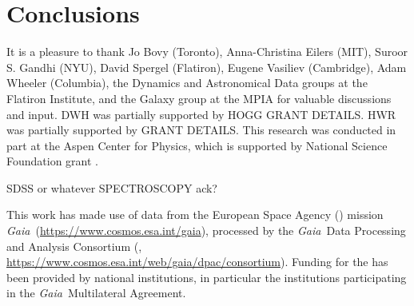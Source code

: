 \documentclass[modern]{aastex63}
\newcommand{\gaia}{\textsl{Gaia}}
\newcommand{\apogee}{\acronym{APOGEE}}
\newcommand{\sdss}{\acronym{SDSS}}
\begin{document}



\section{Conclusions}
\label{sec:conclusions}



\acknowledgments
It is a pleasure to thank
  Jo Bovy (Toronto),
  Anna-Christina Eilers (MIT),
  Suroor S. Gandhi (NYU),
  David Spergel (Flatiron),
  Eugene Vasiliev (Cambridge),
  Adam Wheeler (Columbia),
  the Dynamics and Astronomical Data groups at the Flatiron Institute,
  and the Galaxy group at the MPIA
for valuable discussions and input.
DWH was partially supported by HOGG GRANT DETAILS.
HWR was partially supported by GRANT DETAILS.
This research was conducted in part at the Aspen Center for Physics,
which is supported by National Science Foundation grant .

SDSS or whatever SPECTROSCOPY ack?

This work has made use of data from the European Space Agency ()
mission \gaia\ (\url{https://www.cosmos.esa.int/gaia}), processed by the \gaia\
Data Processing and Analysis Consortium (,
\url{https://www.cosmos.esa.int/web/gaia/dpac/consortium}). Funding for the
\acronym{DPAC}
has been provided by national institutions, in particular the institutions
participating in the \gaia\ Multilateral Agreement.


\end{document}
